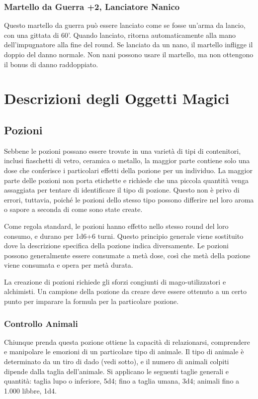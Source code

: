 \documentclass{article}
\begin{document}
\begin{multicols}{2}
\subsubsection{Martello da Guerra +2, Lanciatore Nanico}
Questo martello da guerra può essere lanciato come se fosse un'arma da lancio, con una gittata di 60'. Quando lanciato, ritorna automaticamente alla mano dell'impugnatore alla fine del round. Se lanciato da un nano, il martello infligge il doppio del danno normale. Non nani possono usare il martello, ma non ottengono il bonus di danno raddoppiato.


\section{Descrizioni degli Oggetti Magici}

\subsection{Pozioni}
Sebbene le pozioni possano essere trovate in una varietà di tipi di contenitori, inclusi fiaschetti di vetro, ceramica o metallo, la maggior parte contiene solo una dose che conferisce i particolari effetti della pozione per un individuo. La maggior parte delle pozioni non porta etichette e richiede che una piccola quantità venga assaggiata per tentare di identificare il tipo di pozione. Questo non è privo di errori, tuttavia, poiché le pozioni dello stesso tipo possono differire nel loro aroma o sapore a seconda di come sono state create.

Come regola standard, le pozioni hanno effetto nello stesso round del loro consumo, e durano per 1d6+6 turni. Questo principio generale viene sostituito dove la descrizione specifica della pozione indica diversamente. Le pozioni possono generalmente essere consumate a metà dose, così che metà della pozione viene consumata e opera per metà durata.

La creazione di pozioni richiede gli sforzi congiunti di mago-utilizzatori e alchimisti. Un campione della pozione da creare deve essere ottenuto a un certo punto per imparare la formula per la particolare pozione.

\subsubsection{Controllo Animali}
Chiunque prenda questa pozione ottiene la capacità di relazionarsi, comprendere e manipolare le emozioni di un particolare tipo di animale. Il tipo di animale è determinato da un tiro di dado (vedi sotto), e il numero di animali colpiti dipende dalla taglia dell'animale. Si applicano le seguenti taglie generali e quantità: taglia lupo o inferiore, 5d4; fino a taglia umana, 3d4; animali fino a 1.000 libbre, 1d4.


\end{multicols}
\end{document}
